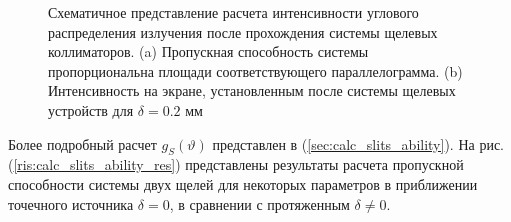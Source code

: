 \begin{figure}[H]
  \centering
  \hfill
  \caption{Схематичное представление расчета интенсивности углового
  распределения излучения после прохождения системы щелевых коллиматоров. (a) Пропускная способность системы пропорциональна площади
  соответствующего параллелограмма. (b) Интенсивность на экране, установленным после системы щелевых устройств
  для  $\delta = 0.2$ мм}
  \label{ris:how_many_quants_use_parallelogr}
\end{figure}
Более подробный расчет $g_S(\vartheta)$ представлен в (\ref{sec:calc_slits_ability}).
На рис. (\ref{ris:calc_slits_ability_res}) представлены результаты расчета пропускной способности
системы двух щелей для некоторых параметров в приближении точечного источника $\delta = 0$, в
сравнении с протяженным $\delta \neq 0$.

